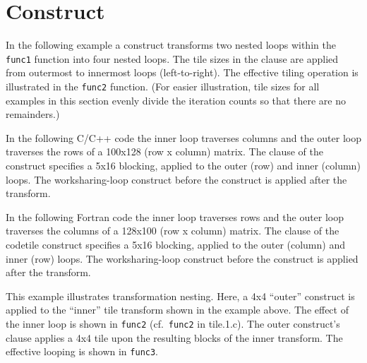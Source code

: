 \section{ Construct}
\label{sec:tile}

In the following example a  construct transforms two nested loops
within the \texttt{func1} function into four nested loops.
The tile sizes in the  clause are applied from outermost
to innermost loops (left-to-right). The effective tiling operation is illustrated in
the \texttt{func2} function. 
(For easier illustration, tile sizes for all examples in this section evenly 
divide the iteration counts so that there are no remainders.)

In the following C/C++ code the inner loop traverses columns
and the outer loop traverses the rows of a 100x128 (row x column) matrix.  
The  clause of the  construct specifies
a 5x16 blocking, applied to the outer (row) and inner (column) loops.
The worksharing-loop construct before the 
construct is applied after the transform.


In the following Fortran code the inner loop traverses rows 
and the outer loop traverses the columns of a 128x100 (row x column) matrix.  
The   clause of the code{tile} construct specifies 
a 5x16 blocking, applied to the outer (column) and inner (row) loops.
The worksharing-loop construct before the 
construct is applied after the transform.

\clearpage

This example illustrates transformation nesting.
Here, a 4x4 ``outer''   construct is applied to the ``inner'' tile transform shown in the example above.
The effect of the inner loop is shown in \texttt{func2} (cf.\ \texttt{func2} in tile.1.c).
The outer  construct's  clause applies a 4x4 tile upon the resulting
blocks of the inner transform.  The effective looping is shown in \texttt{func3}.

